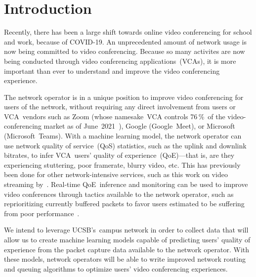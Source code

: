 \section{Introduction}\label{introduction}


    Recently, there has been a large shift towards online video conferencing for school and work, because of COVID-19. An unprecedented amount of network usage is now being committed to video conferencing. Because so many activites are now being conducted through video conferencing applications~(VCAs), it is more important than ever to understand and improve the video conferencing experience.

    The network operator is in a unique position to improve video conferencing for users of the network, without requiring any direct involvement from users or VCA~vendors such as Zoom (whose namesake~VCA controls 76\,\%~of the video-conferencing market as of June~2021~\autocite{kim2021}), Google (Google~Meet), or Microsoft (Microsoft~Teams). With a machine learning model, the network operator can use network quality of service~(QoS) statistics, such as the uplink and downlink bitrates, to infer VCA~users' quality of experience~(QoE)---that is, are they experiencing stuttering, poor framerate, blurry video, etc. This has previously been done for other network-intensive services, such as this work on video streaming by~\textcite{ChenYanjiao2015FQtQ}. Real-time QoE~inference and monitoring can be used to improve video conferences through tactics available to the network operator, such as reprioritizing currently buffered packets to favor users estimated to be suffering from poor performance~\autocite{DinakiHosseinEbrahimi2021FVQW}.

    We intend to leverage UCSB's~campus network in order to collect data that will allow us to create machine learning models capable of predicting users' quality of experience from the packet capture data available to the network operator. With these models, network operators will be able to write improved network routing and queuing algorithms to optimize users' video conferencing experiences. %

